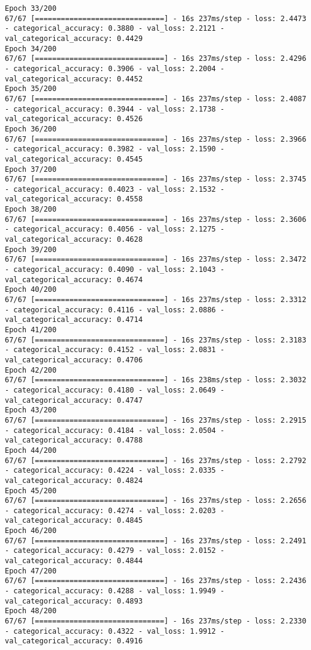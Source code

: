\begin{lstlisting}
Epoch 33/200
67/67 [==============================] - 16s 237ms/step - loss: 2.4473 - categorical_accuracy: 0.3880 - val_loss: 2.2121 - val_categorical_accuracy: 0.4429
Epoch 34/200
67/67 [==============================] - 16s 237ms/step - loss: 2.4296 - categorical_accuracy: 0.3906 - val_loss: 2.2004 - val_categorical_accuracy: 0.4452
Epoch 35/200
67/67 [==============================] - 16s 237ms/step - loss: 2.4087 - categorical_accuracy: 0.3944 - val_loss: 2.1738 - val_categorical_accuracy: 0.4526
Epoch 36/200
67/67 [==============================] - 16s 237ms/step - loss: 2.3966 - categorical_accuracy: 0.3982 - val_loss: 2.1590 - val_categorical_accuracy: 0.4545
Epoch 37/200
67/67 [==============================] - 16s 237ms/step - loss: 2.3745 - categorical_accuracy: 0.4023 - val_loss: 2.1532 - val_categorical_accuracy: 0.4558
Epoch 38/200
67/67 [==============================] - 16s 237ms/step - loss: 2.3606 - categorical_accuracy: 0.4056 - val_loss: 2.1275 - val_categorical_accuracy: 0.4628
Epoch 39/200
67/67 [==============================] - 16s 237ms/step - loss: 2.3472 - categorical_accuracy: 0.4090 - val_loss: 2.1043 - val_categorical_accuracy: 0.4674
Epoch 40/200
67/67 [==============================] - 16s 237ms/step - loss: 2.3312 - categorical_accuracy: 0.4116 - val_loss: 2.0886 - val_categorical_accuracy: 0.4714
Epoch 41/200
67/67 [==============================] - 16s 237ms/step - loss: 2.3183 - categorical_accuracy: 0.4152 - val_loss: 2.0831 - val_categorical_accuracy: 0.4706
Epoch 42/200
67/67 [==============================] - 16s 238ms/step - loss: 2.3032 - categorical_accuracy: 0.4180 - val_loss: 2.0649 - val_categorical_accuracy: 0.4747
Epoch 43/200
67/67 [==============================] - 16s 237ms/step - loss: 2.2915 - categorical_accuracy: 0.4184 - val_loss: 2.0504 - val_categorical_accuracy: 0.4788
Epoch 44/200
67/67 [==============================] - 16s 237ms/step - loss: 2.2792 - categorical_accuracy: 0.4224 - val_loss: 2.0335 - val_categorical_accuracy: 0.4824
Epoch 45/200
67/67 [==============================] - 16s 237ms/step - loss: 2.2656 - categorical_accuracy: 0.4274 - val_loss: 2.0203 - val_categorical_accuracy: 0.4845
Epoch 46/200
67/67 [==============================] - 16s 237ms/step - loss: 2.2491 - categorical_accuracy: 0.4279 - val_loss: 2.0152 - val_categorical_accuracy: 0.4844
Epoch 47/200
67/67 [==============================] - 16s 237ms/step - loss: 2.2436 - categorical_accuracy: 0.4288 - val_loss: 1.9949 - val_categorical_accuracy: 0.4893
Epoch 48/200
67/67 [==============================] - 16s 237ms/step - loss: 2.2330 - categorical_accuracy: 0.4322 - val_loss: 1.9912 - val_categorical_accuracy: 0.4916

\end{lstlisting}
